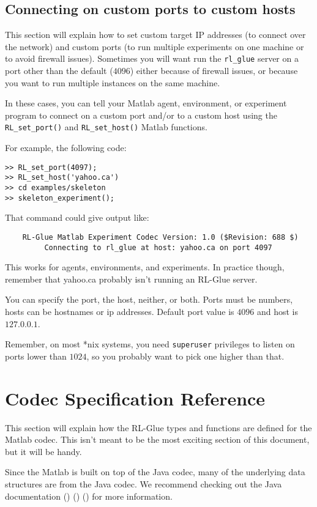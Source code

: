 \documentclass[11pt]{article}
\begin{document}
\subsection{Connecting on custom ports to custom hosts}
This section will explain how to set custom target IP addresses (to connect over the network) and custom ports (to run multiple experiments on one machine or to avoid firewall issues).
Sometimes you will want run the \texttt{rl\_glue} server on a port other than the default
($4096$) either because of firewall issues, or because you want to run multiple instances on the same machine.

In these cases, you can tell your Matlab agent, environment, or experiment program to connect on a custom port and/or to a custom host using the  \texttt{RL\_set\_port()} and \texttt{RL\_set\_host()} Matlab functions.

For example, the following code:
\begin{verbatim}
>> RL_set_port(4097);
>> RL_set_host('yahoo.ca')
>> cd examples/skeleton
>> skeleton_experiment();
\end{verbatim}

That command could give output like:
\begin{verbatim}
	RL-Glue Matlab Experiment Codec Version: 1.0 ($Revision: 688 $)
	     Connecting to rl_glue at host: yahoo.ca on port 4097
\end{verbatim}

This works for agents, environments, and experiments.  In practice though, remember that yahoo.ca probably isn't running an RL-Glue server.

You can specify the port, the host, neither, or both.  Ports must be numbers, hosts can be hostnames or ip addresses. Default port value is $4096$ and host is $127.0.0.1$.

Remember, on most *nix systems, you need \texttt{superuser} privileges to listen on ports lower than $1024$, so you probably want to pick one higher than that.

\section{Codec Specification Reference}
This section will explain how the RL-Glue types and functions are defined for the Matlab codec.  This isn't meant to be the most exciting section of this document, but it will
be handy.

Since the Matlab is built on top of the Java codec, many of the underlying data structures are from the Java codec.  We recommend checking out the Java documentation () () () for more information.
\end{document}
